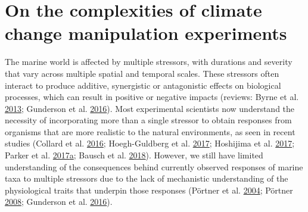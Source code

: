 \documentclass[a4paper,10pt, oneside]{memoir}
\begin{document}
\hypertarget{on-the-complexities-of-climate-change-manipulation-experiments}{%
\section{On the complexities of climate change manipulation experiments}\label{on-the-complexities-of-climate-change-manipulation-experiments}}

The marine world is affected by multiple stressors, with durations and severity that vary across multiple spatial and temporal scales.
These stressors often interact to produce additive, synergistic or antagonistic effects on biological processes, which can result in positive or negative impacts (reviews: Byrne et al. \protect\hyperlink{ref-Byrne2013}{2013}; Gunderson et al. \protect\hyperlink{ref-Gunderson2016}{2016}).
Most experimental scientists now understand the necessity of incorporating more than a single stressor to obtain responses from organisms that are more realistic to the natural environments, as seen in recent studies (Collard et al. \protect\hyperlink{ref-Collard2016}{2016}; Hoegh-Guldberg et al. \protect\hyperlink{ref-Hoegh-Guldberg2017}{2017}; Hoshijima et al. \protect\hyperlink{ref-Hoshijima2017}{2017}; Parker et al. \protect\hyperlink{ref-Parker2017}{2017}\protect\hyperlink{ref-Parker2017}{a}; Bausch et al. \protect\hyperlink{ref-Bausch2018}{2018}).
However, we still have limited understanding of the consequences behind currently observed responses of marine taxa to multiple stressors due to the lack of mechanistic understanding of the physiological traits that underpin those responses (Pörtner et al. \protect\hyperlink{ref-Portner2004}{2004}; Pörtner \protect\hyperlink{ref-Portner2008}{2008}; Gunderson et al. \protect\hyperlink{ref-Gunderson2016}{2016}).
\end{document}
